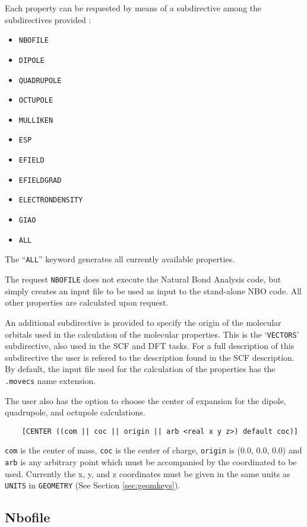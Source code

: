 Each property can be requested by means of a subdirective among the
subdirectives provided :

\begin{itemize}
\item {\tt NBOFILE}
\item {\tt DIPOLE}
\item {\tt QUADRUPOLE}
\item {\tt OCTUPOLE}
\item {\tt MULLIKEN}
\item {\tt ESP}
\item {\tt EFIELD}
\item {\tt EFIELDGRAD}
\item {\tt ELECTRONDENSITY}
\item {\tt GIAO}
\item {\tt ALL}
\end{itemize}

The ``{\tt ALL}'' keyword generates all currently available properties. 

The request {\tt NBOFILE} does not execute the Natural Bond Analysis
code, but simply creates an input file to be used as input to the
stand-alone NBO code.  All other properties are calculated upon
request.

An additional subdirective is provided to specify the origin of the
molecular orbitals used in the calculation of the molecular
properties. This is the `{\tt VECTORS}' subdirective, also used in the
SCF and DFT tasks. For a full description of this subdirective
the user is refered to the description found in the SCF description.
By default, the input file used for the calculation of the properties
has the \verb+.movecs+ name extension. 

The user also has the option to choose the center of expansion for
the dipole, quadrupole, and octupole calculations.

\begin{verbatim}
    [CENTER ((com || coc || origin || arb <real x y z>) default coc)]
\end{verbatim}

\verb+com+ is the center of mass, \verb+coc+ is the center of charge, \verb+origin+ is 
(0.0, 0.0, 0.0) and \verb+arb+ is any arbitrary point which must be accompanied
by the coordinated to be used.  Currently the x, y, and z coordinates
must be given in the same units as \verb+UNITS+ in \verb+GEOMETRY+ (See Section
\ref{sec:geomkeys}).

\subsection{Nbofile}
\label{sec:Nbofile}

